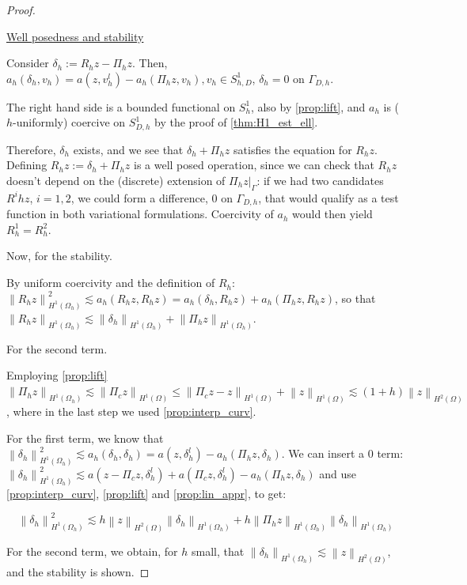 \documentclass[english,a4paper,10pt,oneside]{scrbook}	%
\theoremstyle{break}
\newenvironment{mproof}[1][\proofname]{%
  \begin{proof}[#1]$ $\par\nobreak\ignorespaces
}{%
  \end{proof}
}
\renewcommand*{\proofname}{Proof}
\theoremstyle{remark}
\newcommand{\norm}[1]{\left\lVert#1\right\rVert}
\begin{document}
\begin{mproof}

\underline{Well posedness and stability}

Consider $\delta_h := R_h z - \Pi_h z$. Then, $a_h(\delta_h , v_h) = a(z, v_h^l) - a_h(\Pi_h z, v_h), v_h \in S^1_{h,D}$, $\delta_h = 0$ on $\Gamma_{D,h}$.

The right hand side is a bounded functional on $S^1_h$, also by \cref{prop:lift}, and $a_h$ is ($h$-uniformly) coercive on $S^1_{D,h}$ by the proof of \cref{thm:H1_est_ell}.

Therefore, $\delta_h$ exists, and we see that $\delta_h+\Pi_h z$ satisfies the equation for $R_hz$. Defining $R_h z := \delta_h + \Pi_h z$ is a well posed operation, since we can check that $R_h z$ doesn't depend on the (discrete) extension of $\Pi_h z|_{\Gamma }$: if we had two candidates $R^ihz$, $i=1,2$, we could form a difference, $0$ on $\Gamma_{D,h}$, that would qualify as a test function in both variational formulations. Coercivity of $a_h$ would then yield $R_h^1=R_h^2$.

Now, for the stability.

By uniform coercivity and the definition of $R_h$: $\norm{R_h z}_{H^1(\Omega_h)}^2 \lesssim a_h(R_h z, R_h z) = a_h(\delta_h,R_h z) + a_h(\Pi_h z, R_h z)$, so that $\norm{R_h z}_{H^1(\Omega_h)} \lesssim \norm{\delta_h }_{H^1(\Omega_h)} + \norm{\Pi_h z }_{H^1(\Omega_h)}$.

For the second term.

Employing \cref{prop:lift} $\norm{\Pi_h z }_{H^1(\Omega_h)}\lesssim \norm{\Pi_c z }_{H^1(\Omega)} \leq \norm{\Pi_c z -z }_{H^1(\Omega)}+\norm{z }_{H^1(\Omega)} \lesssim (1+h)\norm{z}_{H^2(\Omega)}$, where in the last step we used \cref{prop:interp_curv}.

For the first term, we know that $ \norm{\delta_h }_{H^1(\Omega_h)}^2 \lesssim a_h(\delta_h, \delta_h) =  a(z, \delta_h^l) - a_h(\Pi_h z, \delta_h)$. We can insert a $0$ term: $ \norm{\delta_h }_{H^1(\Omega_h)}^2 \lesssim a(z-\Pi_c z, \delta_h^l) + a(\Pi_c z, \delta_h^l) - a_h(\Pi_h z, \delta_h)$ and use \cref{prop:interp_curv}, \cref{prop:lift} and \cref{prop:lin_appr}, to get:

$$ \norm{\delta_h }_{H^1(\Omega_h)}^2 \lesssim h \norm{z}_{H^2(\Omega)}\norm{\delta_h}_{H^1(\Omega_h)} + h\norm{\Pi_h z}_{H^1(\Omega_h)}\norm{\delta_h}_{H^1(\Omega_h)}$$

For the second term, we obtain, for $h$ small, that $\norm{\delta_h }_{H^1(\Omega_h)} \lesssim \norm{z}_{H^2(\Omega)}$, and the stability is shown.


\end{mproof}
\end{document}
